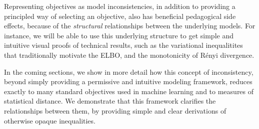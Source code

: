\documentclass[twoside]{article}
\theoremstyle{plain}
\theoremstyle{definition}
\begin{document}
Representing objectives as model inconsistencies, in addition to providing a principled way of selecting an objective, also has beneficial pedagogical side effects, because of the \emph{structural} relationships between the underlying models.
For instance, we will be able to use this underlying structure
to get simple and intuitive visual proofs of technical results,
such as the variational inequalitites that traditionally motivate the ELBO,
and the monotonicity of R\'enyi divergence.



In the coming sections, we show in more detail how this concept of inconsistency, beyond simply providing a permissive and intuitive modeling framework, reduces exactly to many standard objectives used in machine learning and to measures of statistical distance.
 We demonstrate that this framework clarifies the relationships between them, by providing simple and clear derivations of otherwise opaque inequalities.
\end{document}
